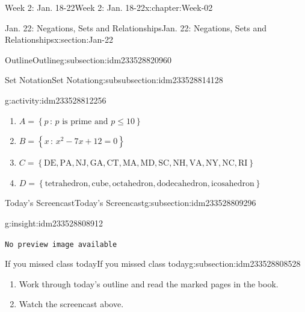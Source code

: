 \documentclass[oneside,10pt,]{book}
\newcommand{\mono}[1]{\texttt{#1}}
\numberwithin{equation}{section}
\newlength{\qrsize}
\newlength{\previewwidth}
\renewcommand{\le}{\leqslant}
\newcommand{\set}[1]{\left\{ {#1} \right\}}
\newcommand{\setof}[2]{{\left\{#1\,\colon\,#2\right\}}}
\begin{document}
\begin{chapterptx}{Week 2: Jan. 18-22}{}{Week 2: Jan. 18-22}{}{}{x:chapter:Week-02}
\begin{sectionptx}{Jan. 22: Negations, Sets and Relationships}{}{Jan. 22: Negations, Sets and Relationships}{}{}{x:section:Jan-22}
\begin{subsectionptx}{Outline}{}{Outline}{}{}{g:subsection:idm233528820960}
\begin{subsubsectionptx}{Set Notation}{}{Set Notation}{}{}{g:subsubsection:idm233528814128}
\begin{activity}{}{g:activity:idm233528812256}
%
\begin{enumerate}
\item{}\(\displaystyle A = \setof{p}{p\text{ is prime and } p \le 10}\)%
\item{}\(\displaystyle B = \setof{x}{x^2-7x+12=0}\)%
\item{}\(\displaystyle C = \set{\text{DE},\text{PA},\text{NJ},\text{GA},\text{CT},\text{MA},\text{MD},\text{SC},\text{NH},\text{VA},\text{NY},\text{NC},\text{RI}}\)%
\item{}\(\displaystyle D= \set{\text{tetrahedron},\text{cube},\text{octahedron},\text{dodecahedron},\text{icosahedron}}\)%
\end{enumerate}
\end{activity}%
\end{subsubsectionptx}
\end{subsectionptx}
%
%
\typeout{************************************************}
\typeout{************************************************}
%
\begin{subsectionptx}{Today's Screencast}{}{Today's Screencast}{}{}{g:subsection:idm233528809296}
\begin{insight}{}{g:insight:idm233528808912}%
\setlength{\qrsize}{9em}
\setlength{\previewwidth}{\linewidth}
\addtolength{\previewwidth}{-\qrsize}
\begin{tcbraster}[raster columns=2, raster column skip=1pt, raster halign=center, raster force size=false, raster left skip=0pt, raster right skip=0pt]%
\begin{tcolorbox}[previewstyle, width=\previewwidth]%
\mono{No preview image available}%
\end{tcolorbox}%
\begin{tcolorbox}[qrstyle]%
[QR LINK]\end{tcolorbox}%
\end{tcbraster}%
\end{insight}
\end{subsectionptx}
%
%
\typeout{************************************************}
\typeout{************************************************}
%
\begin{subsectionptx}{If you missed class today}{}{If you missed class today}{}{}{g:subsection:idm233528808528}
%
\begin{enumerate}
\item{}Work through today's outline and read the marked pages in the book.%
\item{}Watch the screencast above.%

\end{enumerate}
\end{subsectionptx}
\end{sectionptx}
\end{chapterptx}
\end{document}
